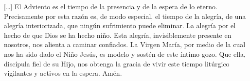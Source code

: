 \begin{introstyle}
	{[}\ldots{}{]} El Adviento es el tiempo de la presencia y de la espera de lo eterno. Precisamente por esta razón es, de modo especial, el tiempo de la alegría, de una alegría interiorizada, que ningún sufrimiento puede eliminar. La alegría por el hecho de que Dios se ha hecho niño. Esta alegría, invisiblemente presente en nosotros, nos alienta a caminar confiados. La Virgen María, por medio de la cual nos ha sido dado el Niño Jesús, es modelo y sostén de este íntimo gozo. Que ella, discípula fiel de su Hijo, nos obtenga la gracia de vivir este tiempo litúrgico vigilantes y activos en la espera. Amén.
\end{introstyle}